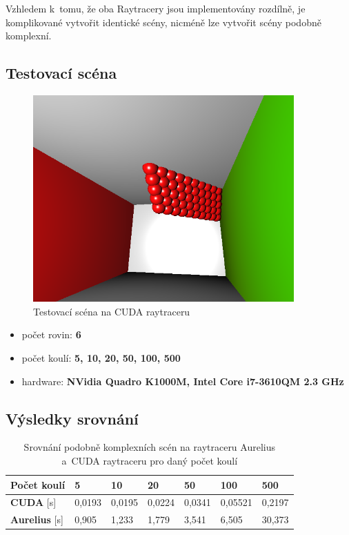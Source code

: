 \documentclass[12pt,a4paper,titlepage,final]{report}
\begin{document}
Vzhledem k~tomu, že oba Raytracery jsou implementovány rozdílně, je komplikované vytvořit identické scény, nicméně lze vytvořit scény podobně komplexní.

\subsection{Testovací scéna}

\begin{figure}[ht]
\begin{center}
\includegraphics[width=10cm]{images/test-scene.png}
\caption{Testovací scéna na CUDA raytraceru}
\label{fig:theory}
\end{center}
\end{figure}

\begin{itemize}
	\item počet rovin: \textbf{6}
	\item počet koulí: \textbf{5, 10, 20, 50, 100, 500}
	\item hardware: \textbf{NVidia Quadro K1000M, Intel Core i7-3610QM 2.3 GHz}
\end{itemize}

\subsection{Výsledky srovnání}

\begin{table}
\centering
\begin{tabular}{ | l | l | l | l | l | l | l |}
\hline
\textbf{Počet koulí} & 5  & 10  & 20 & 50 & 100 & 500 \\
\hline
\textbf{CUDA} [s] & 0,0193 & 0,0195 & 0,0224 & 0,0341 & 0,05521 & 0,2197 \\
\hline
\textbf{Aurelius} [s] & 0,905 & 1,233 & 1,779 & 3,541 & 6,505 & 30,373 \\
\hline
\end{tabular}
\caption{Srovnání podobně komplexních scén na raytraceru Aurelius a~CUDA raytraceru pro daný počet koulí}
\end{table}
\end{document}
